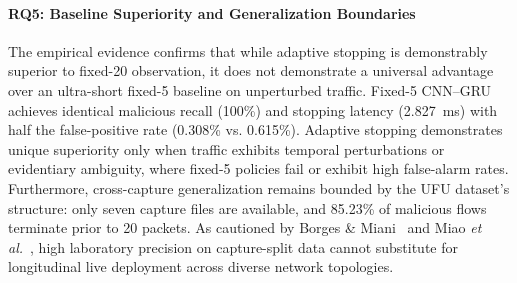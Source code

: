 \documentclass[conference]{IEEEtran}
\begin{document}
\paragraph{RQ5: Baseline Superiority and Generalization Boundaries}
The empirical evidence confirms that while adaptive stopping is demonstrably superior to fixed-20 observation, it does not demonstrate a universal advantage over an ultra-short fixed-5 baseline on unperturbed traffic. Fixed-5 CNN--GRU achieves identical malicious recall (100\%) and stopping latency (2.827~ms) with half the false-positive rate (0.308\% vs. 0.615\%). Adaptive stopping demonstrates unique superiority only when traffic exhibits temporal perturbations or evidentiary ambiguity, where fixed-5 policies fail or exhibit high false-alarm rates. Furthermore, cross-capture generalization remains bounded by the UFU dataset's structure: only seven capture files are available, and 85.23\% of malicious flows terminate prior to 20 packets. As cautioned by Borges \& Miani~\cite{ufu} and Miao \emph{et al.}~\cite{wedoh}, high laboratory precision on capture-split data cannot substitute for longitudinal live deployment across diverse network topologies.
\end{document}
